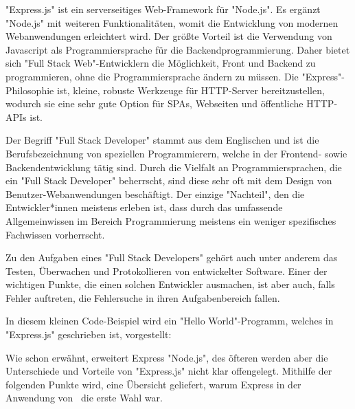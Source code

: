  \label{sec:express}

"Express.js" ist ein serverseitiges Web-Framework für "Node.js". Es ergänzt "Node.js" mit weiteren Funktionalitäten, womit die Entwicklung von modernen Webanwendungen erleichtert wird. Der größte Vorteil ist die Verwendung von Javascript als Programmiersprache für die Backendprogrammierung. Daher bietet sich "Full Stack Web"-Entwicklern die Möglichkeit, Front und Backend zu programmieren, ohne die Programmiersprache ändern zu müssen. Die "Express"-Philosophie ist, kleine, robuste Werkzeuge für HTTP-Server bereitzustellen, wodurch sie eine sehr gute Option für SPAs, Webseiten und öffentliche HTTP-APIs ist. \cite{Express}

Der Begriff "Full Stack Developer" stammt aus dem Englischen und ist die Berufsbezeichnung von speziellen Programmierern, welche in der Frontend- sowie Backendentwicklung tätig sind. Durch die Vielfalt an Programmiersprachen, die ein "Full Stack Developer" beherrscht, sind diese sehr oft mit dem Design von Benutzer-Webanwendungen beschäftigt. Der einzige "Nachteil", den die Entwickler*innen meistens erleben ist, dass durch das umfassende Allgemeinwissen im Bereich Programmierung meistens ein weniger spezifisches Fachwissen vorherrscht. 

Zu den Aufgaben eines "Full Stack Developers" gehört auch unter anderem das Testen, Überwachen und Protokollieren von entwickelter Software. Einer der wichtigen Punkte, die einen solchen Entwickler ausmachen, ist aber auch, falls Fehler auftreten, die Fehlersuche in ihren Aufgabenbereich fallen. \cite{FullStack}

\pagebreak
{}

In diesem kleinen Code-Beispiel wird ein "Hello World"-Programm, welches in "Express.js" geschrieben ist, vorgestellt:


 \cite{Express}


Wie schon erwähnt, erweitert Express "Node.js", des öfteren werden aber die Unterschiede und Vorteile von "Express.js" nicht klar offengelegt. Mithilfe der folgenden Punkte wird, eine Übersicht geliefert, warum Express in der Anwendung von \ZELIA\ die erste Wahl war.

